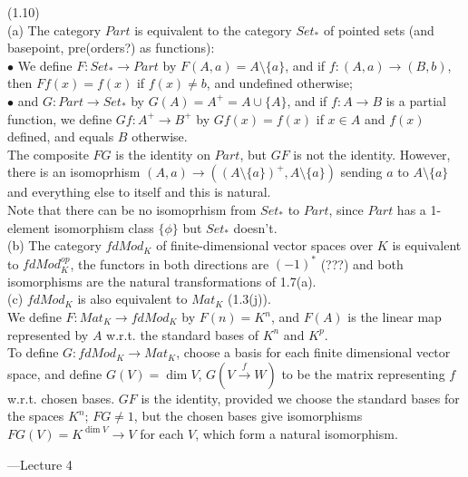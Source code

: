 \documentclass[a4paper]{article}
\begin{document}
\begin{eg} (1.10)\\
    (a) The category $Part$ is equivalent to the category $Set_*$ of pointed sets (and basepoint, pre(orders?) as functions):\\
    $\bullet$ We define $F:Set_* \to Part$ by $F(A,a) = A \setminus \{a\}$, and if $f:(A,a) \to (B,b)$, then $Ff(x) = f(x)$ if $f(x) \neq b$, and undefined otherwise;\\
    $\bullet$ and $G: Part \to Set_*$ by $G(A) = A^+ = A \cup \{A\}$, and if $f:A \to B$ is a partial function, we define $Gf:A^+ \to B^+$ by $Gf(x) = f(x)$ if $x \in A$ and $f(x)$ defined, and equals $B$ otherwise.\\
    The composite $FG$ is the identity on $Part$, but $GF$ is not the identity. However, there is an isomoprhism $(A,a) \to ((A \setminus \{a\})^+,A \setminus\{a\})$ sending $a$ to $A \setminus \{a\}$ and everything else to itself and this is natural.\\
    Note that there can be no isomoprhism from $Set_*$ to $Part$, since $Part $ has a 1-element isomorphism class $\{\phi\}$ but $Set_*$ doesn't.\\
    (b) The category $fdMod_K$ of finite-dimensional vector spaces over $K$ is equivalent to $fdMod_K^{op}$, the functors in both directions are $(-1)^*$ (???) and both isomorphisms are the natural transformations of 1.7(a).\\
    (c) $fdMod_K$ is also equivalent to $Mat_K$ (1.3(j)).\\
    We define $F:Mat_K \to fdMod_K$ by $F(n) = K^n$, and $F(A)$ is the linear map represented by $A$ w.r.t. the standard bases of $K^n$ and $K^p$.\\
    To define $G:fdMod_K \to Mat_K$, choose a basis for each finite dimensional vector space, and define $G(V) = \dim V$, $G(V \xrightarrow{f} W)$ to be the matrix representing $f$ w.r.t. chosen bases. $GF$ is the identity, provided we choose the standard bases for the spaces $K^n$; $FG \neq 1$, but the chosen bases give isomorphisms $FG(V) = K^{\dim V} \to V$ for each $V$, which form a natural isomorphism.
\end{eg}

---Lecture 4
\end{document}
